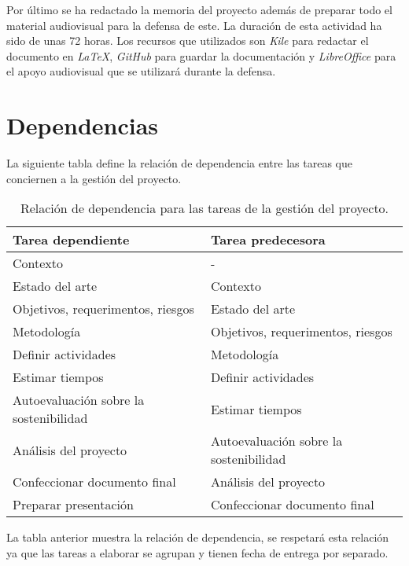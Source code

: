 Por último se ha redactado la memoria del proyecto además de preparar todo el material audiovisual para la defensa de este. La duración de esta actividad ha sido de unas 72 horas. Los recursos que utilizados son \textit{Kile} para redactar el documento en \textit{LaTeX}, \textit{GitHub} para guardar la documentación y \textit{LibreOffice} para el apoyo audiovisual que se utilizará durante la defensa.

\section{Dependencias}

La siguiente tabla define la relación de dependencia entre las tareas que conciernen a la gestión del proyecto.

\begin{table}[H]
\centering
 \begin{tabular}{|| l | l ||}
    \hline  
    Tarea dependiente & Tarea predecesora \\
    \hline\hline
    Contexto & - \\
    \hline
    Estado del arte & Contexto \\
    \hline
    Objetivos, requerimentos, riesgos & Estado del arte \\
    \hline
    Metodología & Objetivos, requerimentos, riesgos \\
    \hline
    Definir actividades & Metodología \\
    \hline
    Estimar tiempos & Definir actividades \\
    \hline
    Autoevaluación sobre la sostenibilidad & Estimar tiempos \\
    \hline
    Análisis del proyecto & Autoevaluación sobre la sostenibilidad \\
    \hline
    Confeccionar documento final & Análisis del proyecto \\
    \hline
    Preparar presentación & Confeccionar documento final \\
    \hline
 \end{tabular}
 \caption{Relación de dependencia para las tareas de la gestión del proyecto.}
 \label{table:1}
\end{table}

La tabla anterior muestra la relación de dependencia, se respetará esta relación ya que las tareas a elaborar se agrupan y tienen fecha de entrega por separado. 


